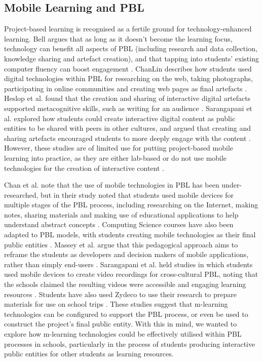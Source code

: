\subsection{Mobile Learning and PBL}
Project-based learning is recognised as a fertile ground for technology-enhanced learning. Bell argues that as long as it doesn't become the learning focus, technology can benefit all aspects of PBL (including research and data collection, knowledge sharing and artefact creation), and that tapping into students' existing computer fluency can boost engagement \citep{Bell2010}. ChanLin describes how students used digital technologies within PBL for researching on the web, taking photographs, participating in online communities and creating web pages as final artefacts \citep{ChanLin2008}. Heslop et al. found that the creation and sharing of interactive digital artefacts supported metacognitive skills, such as writing for an audience \citep{Heslop2017}. Sarangapani et al. explored how students could create interactive digital content as public entities to be shared with peers in other cultures, and argued that creating and sharing artefacts encouraged students to more deeply engage with the content \citep{Sarangapani2018}. However, these studies are of limited use for putting project-based mobile learning into practice, as they are either lab-based \citep{Heslop2017} or do not use mobile technologies for the creation of interactive content \citep{Sarangapani2018, ChanLin2008}.

Chan et al. note that the use of mobile technologies in PBL has been under-researched, but in their study noted that students used mobile devices for multiple stages of the PBL process, including researching on the Internet, making notes, sharing materials and making use of educational applications to help understand abstract concepts \citep{Chan2015}. Computing Science courses have also been adapted to PBL models, with students creating mobile technologies as their final public entities \citep{Massey2006, Rahman2018}. Massey et al. argue that this pedagogical approach aims to reframe the students as developers and decision makers of mobile applications, rather than simply end-users \citep{Massey2006}. Sarangapani et al. held studies in which students used mobile devices to create video recordings for cross-cultural PBL, noting that the schools claimed the resulting videos were accessible and engaging learning resources \citep{Sarangapani2016}. Students have also used Zydeco to use their research to prepare materials for use on school trips \citep{}. These studies suggest that m-learning technologies can be configured to support the PBL process, or even be used to construct the project's final public entity. With this in mind, we wanted to explore how m-learning technologies could be effectively utilised within PBL processes in schools, particularly in the process of students producing interactive public entities for other students as learning resources.

